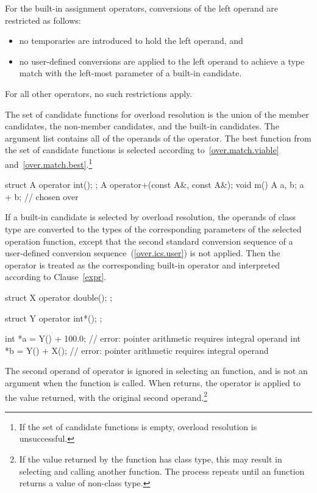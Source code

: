 \pnum
For the built-in assignment operators, conversions of the left
operand are restricted as follows:

\begin{itemize}
\item
no temporaries are introduced to hold the left operand, and
\item
no user-defined conversions are applied to the left operand to achieve
a type match with the left-most parameter of a built-in candidate.
\end{itemize}

\pnum
For all other operators, no such restrictions apply.

\pnum
The set of candidate functions for overload resolution is the
union of the member candidates, the non-member candidates, and
the built-in candidates.
The argument list contains all of the
operands of the operator.
The best function from the set of candidate functions is selected
according to~\ref{over.match.viable}
and~\ref{over.match.best}.\footnote{If the set of candidate functions is empty,
overload resolution is unsuccessful.}
\enterexample

\begin{codeblock}
struct A {
  operator int();
};
A operator+(const A&, const A&);
void m() {
  A a, b;
  a + b;            //  chosen over 
}
\end{codeblock}
\exitexample

\pnum
If a built-in candidate is selected by overload resolution, the
operands of class type are converted to the types of the corresponding parameters
of the selected operation function, except that the second standard conversion
sequence of a user-defined conversion sequence~(\ref{over.ics.user}) is not applied.
Then the operator is treated as the corresponding
built-in operator and interpreted according to Clause~\ref{expr}.
\enterexample
\begin{codeblock}
struct X {
  operator double();
};

struct Y {
  operator int*();
};

int *a = Y() + 100.0;      // error: pointer arithmetic requires integral operand
int *b = Y() + X();        // error: pointer arithmetic requires integral operand
\end{codeblock}
\exitexample

\pnum
The second operand of operator
\tcode{->}
is ignored in selecting an
function, and is not an argument when the
function is called.
When
returns, the operator
\tcode{->}
is applied to the value returned, with the original second
operand.\footnote{If the value returned by the
function has class type, this may result in selecting and calling another
function.
The process repeats until an
function returns a value of non-class type.}

